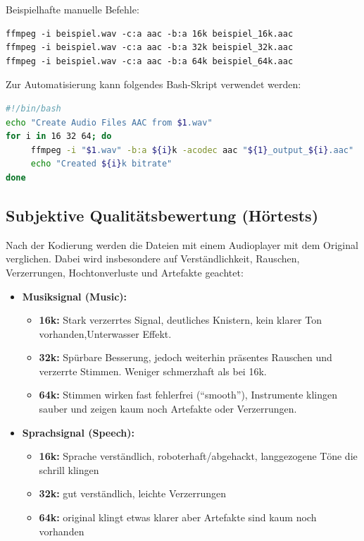 \documentclass[11pt,a4paper]{article}
\begin{document}
Beispielhafte manuelle Befehle:
\begin{lstlisting}
ffmpeg -i beispiel.wav -c:a aac -b:a 16k beispiel_16k.aac
ffmpeg -i beispiel.wav -c:a aac -b:a 32k beispiel_32k.aac
ffmpeg -i beispiel.wav -c:a aac -b:a 64k beispiel_64k.aac
\end{lstlisting}

Zur Automatisierung kann folgendes Bash-Skript verwendet werden:
\begin{lstlisting}[language=bash]
#!/bin/bash
echo "Create Audio Files AAC from $1.wav"
for i in 16 32 64; do
     ffmpeg -i "$1.wav" -b:a ${i}k -acodec aac "${1}_output_${i}.aac"
     echo "Created ${i}k bitrate"
done
\end{lstlisting}

\subsection{Subjektive Qualitätsbewertung (Hörtests)}
Nach der Kodierung werden die Dateien mit einem Audioplayer mit dem Original verglichen. Dabei wird insbesondere auf Verständlichkeit, Rauschen, Verzerrungen, Hochtonverluste und Artefakte geachtet:

\begin{itemize}
    \item \textbf{Musiksignal (Music):}
    \begin{itemize}
        \item \textbf{16k:} Stark verzerrtes Signal, deutliches Knistern, kein klarer Ton vorhanden,Unterwasser Effekt.
        \item \textbf{32k:} Spürbare Besserung, jedoch weiterhin präsentes Rauschen und verzerrte Stimmen. Weniger schmerzhaft als bei 16k.
        \item \textbf{64k:} Stimmen wirken fast fehlerfrei ("`smooth"'), Instrumente klingen sauber und zeigen kaum noch Artefakte oder Verzerrungen.
    \end{itemize}
    \item \textbf{Sprachsignal (Speech):}
    \begin{itemize}
        \item \textbf{16k:} Sprache verständlich, roboterhaft/abgehackt, langgezogene Töne die schrill klingen
        \item \textbf{32k:} gut verständlich, leichte Verzerrungen
        \item \textbf{64k:} original klingt etwas klarer aber Artefakte sind kaum noch vorhanden
    \end{itemize}
\end{itemize}
\end{document}
